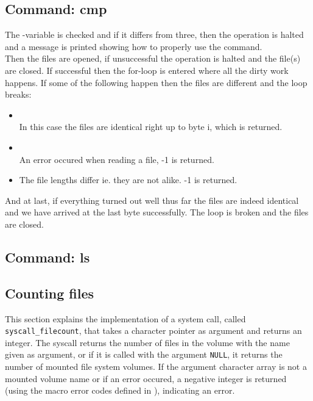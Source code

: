 \subsection{Command: cmp}
The -variable is checked and if it differs from three, then the
operation is halted and a message is printed showing how to properly use the
command.\\
Then the files are opened, if unsuccessful the operation is halted and the
file(s) are closed. If successful then the for-loop is entered where all the
dirty work happens. If some of the following happen then the files are different
and the loop breaks:\\
\begin{itemize}
  \item {}\\
        In this case the files are identical right up to byte i, which is
        returned.
  \item {}\\
        An error occured when reading a file, -1 is returned.
  \item {}
        The file lengths differ ie. they are not alike. -1 is returned.
\end{itemize}
And at last, if everything turned out well thus far the files are indeed
identical and we have arrived at the last byte successfully. The loop is broken
and the files are closed.

\subsection{Command: ls}


\subsection{Counting files}
This section explains the implementation of a system call, called
\verb|syscall_filecount|, that takes a character pointer as argument and
returns an integer. The syscall returns the number of files in the volume with
the name given as argument, or if it is called with the argument \verb|NULL|,
it returns the number of mounted file system volumes. If the argument character
array is not a mounted volume name or if an error occured, a negative integer
is returned (using the macro error codes defined in ), indicating
an error.

